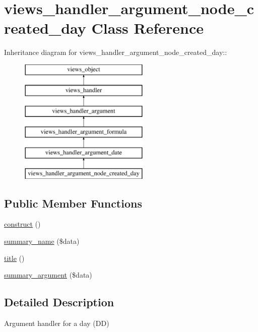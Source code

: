 \hypertarget{classviews__handler__argument__node__created__day}{
\section{views\_\-handler\_\-argument\_\-node\_\-created\_\-day Class Reference}
\label{classviews__handler__argument__node__created__day}
}
Inheritance diagram for views\_\-handler\_\-argument\_\-node\_\-created\_\-day::\begin{figure}[H]
\begin{center}
\leavevmode
\includegraphics[height=6cm]{classviews__handler__argument__node__created__day}
\end{center}
\end{figure}
\subsection*{Public Member Functions}
\begin{CompactItemize}
\item 
\hyperlink{classviews__handler__argument__node__created__day_eb33813a3cc0da642e45a12625da5bde}{construct} ()
\item 
\hyperlink{classviews__handler__argument__node__created__day_cd7fa6e862306ba955d314d464e1cf2d}{summary\_\-name} (\$data)
\item 
\hyperlink{classviews__handler__argument__node__created__day_bf71aafe50941da8e9ad6b4e1627833a}{title} ()
\item 
\hyperlink{classviews__handler__argument__node__created__day_c7f626914f87a04112962bf39d49d454}{summary\_\-argument} (\$data)
\end{CompactItemize}


\subsection{Detailed Description}
Argument handler for a day (DD) 

